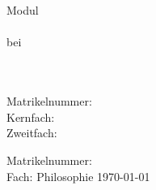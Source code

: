 \ifdefined\layouttitlepage
\thispagestyle{empty}
\begin{titlepage}
\singlespacing

\quad \\[4cm]

\begin{center}
\begin{minipage}{0.8\linewidth}
\begin{center}
\textsc{\MakeLowercase{\autor}} \\[1cm]
{%
    \scshape\Large\onehalfspacing
    \titel \par}
\end{center}
\end{minipage}

\vskip 3.8cm
\emph{\art}
\end{center}

\vfill

\noindent\begin{minipage}{0.5\linewidth}
Modul \emph{\modul} \\
\veranstaltung \\
bei \dozentin \\
\institut \\
\universitaet
\end{minipage}
\begin{minipage}{0.5\linewidth}
\begin{flushright}
\email \\
Matrikelnummer: \matrikelnummer \\
Kernfach:  \\
Zweitfach: \zweitfach \\
\datum
\end{flushright}
\end{minipage}
\end{titlepage}
\fi

\ifdefined\layoutanon
\begin{center}
\noindent\begin{minipage}{0.8\linewidth}
\begin{center}
\emph{\art}
\vskip 1.6cm
{%
    \Large\onehalfspacing
    \titel \par}
\vskip 2.9cm
Matrikelnummer: \matrikelnummer \\
Fach: Philosophie
\vskip 1.5cm
\today
\end{center}
\end{minipage}
\end{center}
\vfill
\fi

